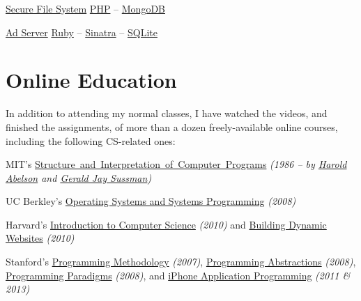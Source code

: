 \documentclass{tccv}
\begin{document}
{{\begin{oneline_projects}
\item{\href{https://github.com/pooriaazimi/secure_file_system}{Secure File System}}
	 {%
		 \href{http://php.net}{PHP} -- %
		 \href{http://www.mongodb.org}{MongoDB}%
	 }

\item{\href{https://github.com/pooriaazimi/adserver}{Ad Server}}
	 {%
	 	\href{https://www.ruby-lang.org/en/}{Ruby} -- %
		\href{http://www.sinatrarb.com}{Sinatra} -- %
		\href{http://www.sqlite.org}{SQLite}%
	 }


\end{oneline_projects}





\vspace{-20pt}




\section{Online Education}

In addition to attending my normal classes, I have watched the videos, and finished the assignments, of more than a dozen freely-available online courses, including the \mbox{following} CS-related ones:

\begin{list}{}{\leftmargin=1em}

\item MIT's \href{http://groups.csail.mit.edu/mac/classes/6.001/abelson-sussman-lectures/}{\mbox{Structure and Interpretation of Computer Programs}} {\it(1986 -- by \href{https://en.wikipedia.org/wiki/Hal_Abelson}{Harold Abelson} and \href{https://en.wikipedia.org/wiki/Gerald_Jay_Sussman}{Gerald Jay Sussman})}

\item UC Berkley's \href{http://www.cs.berkeley.edu/~kubitron/courses/cs162-F08/}{Operating Systems and Systems Programming} {\it(2008)}

\item Harvard's \href{http://cs50.tv/2010/fall/}{Introduction to Computer Science} {\it(2010)} and \href{http://cs75.tv/2010/fall/}{Building Dynamic Websites} {\it(2010)}

\item Stanford's \href{http://see.stanford.edu/see/courseinfo.aspx?coll=824a47e1-135f-4508-a5aa-866adcae1111}{Programming Methodology} {\it(2007)}, \href{http://see.stanford.edu/see/courseinfo.aspx?coll=11f4f422-5670-4b4c-889c-008262e09e4e}{\mbox{Programming} Abstractions} {\it(2008)}, \href{http://see.stanford.edu/see/courseinfo.aspx?coll=2d712634-2bf1-4b55-9a3a-ca9d470755ee}{\mbox{Programming} Paradigms} {\it(2008)}, and \href{http://www.stanford.edu/class/cs193p}{iPhone Application Programming} {\it(2011 \& 2013)}
	

\end{list}}}
\end{document}
